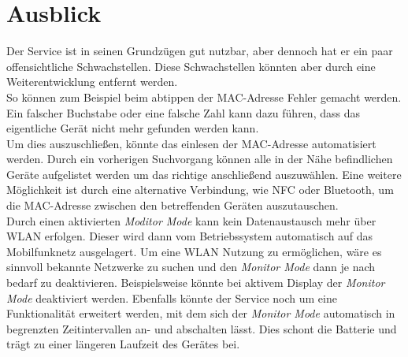 \documentclass[]{report}
\begin{document}
\section{Ausblick}
Der Service ist in seinen Grundzügen gut nutzbar, aber dennoch hat er ein paar offensichtliche Schwachstellen. Diese Schwachstellen könnten aber durch eine Weiterentwicklung entfernt werden.\\ So können zum Beispiel beim abtippen der MAC-Adresse Fehler gemacht werden. Ein falscher Buchstabe oder eine falsche Zahl kann dazu führen, dass das eigentliche Gerät nicht mehr gefunden werden kann. \\
Um dies auszuschließen, könnte das einlesen der MAC-Adresse automatisiert werden. Durch ein vorherigen Suchvorgang können alle in der Nähe befindlichen Geräte aufgelistet werden um das richtige anschließend auszuwählen. Eine weitere Möglichkeit ist durch eine alternative Verbindung, wie NFC oder Bluetooth, um die MAC-Adresse zwischen den betreffenden Geräten auszutauschen.\\
Durch einen aktivierten \textit{Moditor Mode} kann kein Datenaustausch mehr über WLAN erfolgen. Dieser wird dann vom Betriebssystem automatisch auf das Mobilfunknetz ausgelagert. Um eine WLAN Nutzung zu ermöglichen, wäre es sinnvoll bekannte Netzwerke zu suchen und den \textit{Monitor Mode} dann je nach bedarf zu deaktivieren. Beispielsweise könnte bei aktivem Display der \textit{Monitor Mode} deaktiviert werden. 
Ebenfalls könnte der Service noch um eine Funktionalität erweitert werden, mit dem sich der \textit{Monitor Mode} automatisch in begrenzten Zeitintervallen an- und abschalten lässt. Dies schont die Batterie und trägt zu einer längeren Laufzeit des Gerätes bei. \\ 


\end{document}
